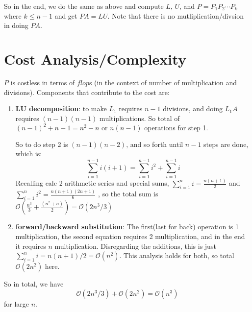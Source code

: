 So in the end, we do the same as above and compute $L$, $U$, and
$P=P_1P_2\cdots P_{k}$ where $k\le n-1$ and get $PA=LU$. Note that there is no
mutliplication/divsion in doing $PA$.

\section{Cost Analysis/Complexity}
$P$ is costless in terms of $flop$s (in the context of number of
multiplication and divisions). Components that contribute to the cost are:
\begin{enumerate}
\item \textbf{LU decomposition}: to make $L_1$ requires $n-1$ divisions, and
  doing  $L_1A$ requires $(n-1)(n-1)$ multiplications. So total of $(n-1)^2 + n-1
  = n^2-n$ or $n(n-1)$ operations for step 1. %

So to do step 2 is $(n-1)(n-2)$, and so forth until $n-1$ steps are done, which is:
$$\sum_{i=1}^{n-1} i(i+1) = \sum_{i=1}^{n-1}i^2 + \sum_{i=1}^{n-1}i$$
Recalling calc 2 arithmetic series and special sums, $\sum_{i=1}^ni =
\frac{n(n+1)}{2}$ and $\sum_{i=1}^ni^2 =\frac{n(n+1)(2n+1)}{6}$ , so the total sum is
$\mathcal{O}(\frac{n^3}{3}+\frac{(n^2+n)}{2}) = \mathcal{O}(2n^3/3)$
\item \textbf{forward/backward substitution}: The first(last for back)
  operation is 1 multiplication, the second equation requires 2
  multiplication, and in the end it requires $n$
  multiplication. Disregarding the additions, this is just
  $\sum_{i=1}^n i = n(n+1)/2 = \mathcal{O}(n^2)$. This analysis holds
  for both, so total $\mathcal{O}(2n^2)$ here.
\end{enumerate}
\noi
So in total, we have $$\mathcal{O}(2n^3/3) + \mathcal{O}(2n^2) =
\mathcal{O}(n^3)$$
for large $n$.

